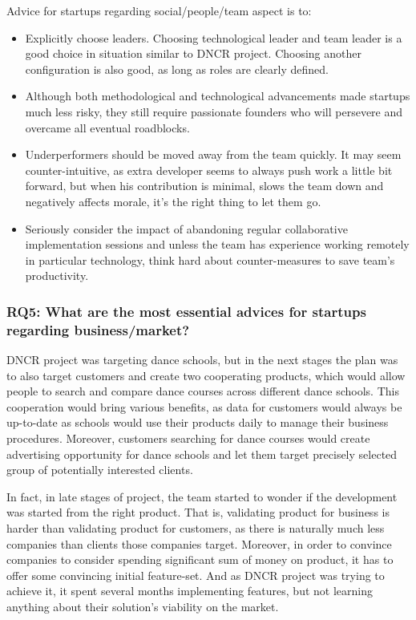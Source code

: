 \documentclass{article}
\begin{document}
Advice for startups regarding social/people/team aspect is to:
\begin{itemize}
\item Explicitly choose leaders. Choosing technological leader and team leader is a good choice in situation similar to DNCR project. Choosing another configuration is also good, as long as roles are clearly defined.
\item Although both methodological and technological advancements made startups much less risky, they still require passionate founders who will persevere and overcame all eventual roadblocks.
\item Underperformers should be moved away from the team quickly. It may seem counter-intuitive, as extra developer seems to always push work a little bit forward, but when his contribution is minimal, slows the team down and negatively affects morale, it's the right thing to let them go.
\item Seriously consider the impact of abandoning regular collaborative implementation sessions and unless the team has experience working remotely in particular technology, think hard about counter-measures to save team's productivity.
\end{itemize}

\subsubsection{RQ5: What are the most essential advices for startups regarding business/market?}
DNCR project was targeting dance schools, but in the next stages the plan was to also target customers and create two cooperating products, which would allow people to search and compare dance courses across different dance schools. This cooperation would bring various benefits, as data for customers would always be up-to-date as schools would use their products daily to manage their business procedures. Moreover, customers searching for dance courses would create advertising opportunity for dance schools and let them target precisely selected group of potentially interested clients.

In fact, in late stages of project, the team started to wonder if the development was started from the right product. That is, validating product for business is harder than validating product for customers, as there is naturally much less companies than clients those companies target. Moreover, in order to convince companies to consider spending significant sum of money on product, it has to offer some convincing initial feature-set. And as DNCR project was trying to achieve it, it spent several months implementing features, but not learning anything about their solution's viability on the market.
\end{document}
